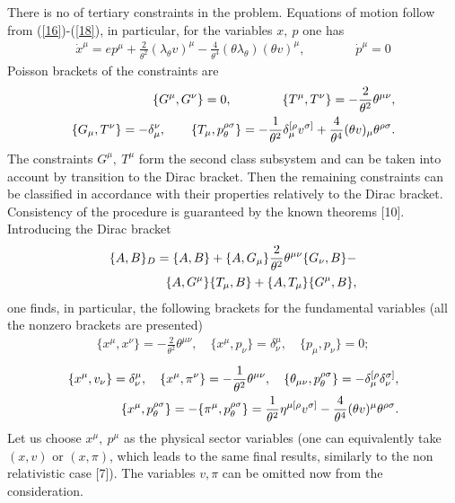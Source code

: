 \documentclass[paper a4]{article}
\begin{document}
There is no of tertiary constraints in the problem.
Equations of motion follow from (\ref{16})-(\ref{18}), in particular,
for the variables $x, ~ p$ one has
\begin{eqnarray}\label{19}
\dot x^\mu=ep^\mu+\frac{2}{\theta^2}(\lambda_\theta v)^\mu-
\frac{4}{\theta^4}(\theta\lambda_{\theta})(\theta v)^\mu, \qquad
\qquad \dot p^\mu=0
\end{eqnarray}
Poisson brackets of the constraints are
\begin{eqnarray}\label{20}
\{G^\mu, G^\nu\}=0, \qquad \qquad \{T^\mu, T^\nu\}=
-\frac{2}{\theta^2}\theta^{\mu\nu}, \cr
\{G_\mu, T^\nu\}=-\delta_\mu^\nu, \qquad
\{T_\mu, p_\theta^{\rho\sigma}\}=-\frac{1}{\theta^2}
\delta_\mu^{[\rho}v^{\sigma ]}+
\frac{4}{\theta^4}(\theta v)_\mu\theta^{\rho\sigma}.
\end{eqnarray}
The constraints $G^\mu, ~ T^\mu$ form the second class subsystem and can
be taken into account by transition to the Dirac bracket. Then the
remaining constraints can be classified in accordance with their properties
relatively to the Dirac bracket. Consistency of the procedure is
guaranteed by the known theorems [10]. Introducing the Dirac bracket
\begin{eqnarray}\label{21}
\{A, B\}_D=\{A, B\}+\{A, G_\mu\}\frac{2}{\theta^2}\theta^{\mu\nu}
\{G_\nu, B\}- \cr
\{A, G^\mu\}\{T_\mu, B\}+\{A, T_\mu\}\{G^\mu, B\},
\end{eqnarray}
one finds, in particular, the following brackets for the
fundamental variables (all the nonzero brackets are presented)
\begin{eqnarray}\label{22}
\{x^\mu, x^\nu\}=-\frac{2}{\theta^2}\theta^{\mu\nu}, \quad
\{x^\mu, p_\nu\}=\delta^\mu_\nu,
\quad \{p_\mu, p_\nu\}=0;
\end{eqnarray}
\begin{eqnarray}\label{23}
\{x^\mu, v_\nu\}=\delta^\mu_\nu, \quad
\{x^\mu, \pi^\nu\}=-\frac{1}{\theta^2}\theta^{\mu\nu}, \quad
\{\theta_{\mu\nu}, p_\theta^{\rho\sigma}\}=-\delta_\mu^{[\rho}
\delta_\nu^{\sigma ]}, \cr
\{x^\mu, p_\theta^{\rho\sigma}\}=-\{\pi^\mu, p_\theta^{\rho\sigma}\}=
\frac{1}{\theta^2}\eta^{\mu [\rho}v^{\sigma ]}-
\frac{4}{\theta^4}(\theta v)^\mu\theta^{\rho\sigma}.
\end{eqnarray}
Let us choose $x^\mu, ~ p^\mu$ as the physical sector variables (one can
equivalently take $(x, v)$ or $(x, \pi)$, which leads to the same final
results, similarly to the non relativistic case [7]).
The variables $v, \pi$ can be omitted now from the consideration.
\end{document}
